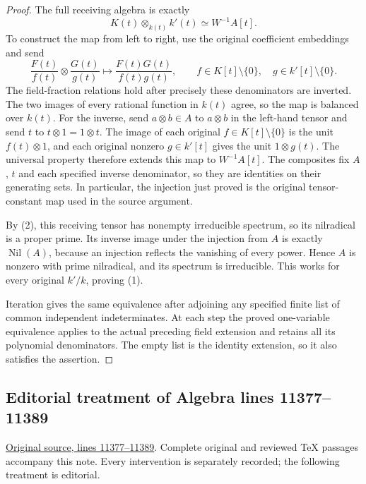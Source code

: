 \begin{proof}
The full receiving algebra is
exactly
$$
K(t)\otimes_{k(t)}k'(t)\simeq W^{-1}A[t].
$$
To construct the map from left
to right, use the original
coefficient embeddings and send
$$
\frac{F(t)}{f(t)}\otimes\frac{G(t)}{g(t)}
\longmapsto\frac{F(t)G(t)}{f(t)g(t)},
\qquad
f\in K[t]\setminus\{0\},\quad
g\in k'[t]\setminus\{0\}.
$$
The field-fraction relations hold
after precisely these denominators
are inverted. The two images of
every rational function in $k(t)$
agree, so the map is balanced over
$k(t)$. For the inverse, send
$a\otimes b\in A$ to $a\otimes b$
in the left-hand tensor and send
$t$ to $t\otimes1=1\otimes t$.
The image of each original
$f\in K[t]\setminus\{0\}$ is
the unit $f(t)\otimes1$, and
each original nonzero $g\in k'[t]$
gives the unit $1\otimes g(t)$.
The universal property therefore
extends this map to $W^{-1}A[t]$.
The composites fix $A$, $t$ and
each specified inverse denominator,
so they are identities on their
generating sets. In particular,
the injection just proved is
the original tensor-constant map
used in the source argument.

By (2), this receiving tensor
has nonempty irreducible spectrum,
so its nilradical is a proper
prime. Its inverse image under
the injection from $A$ is exactly
$\operatorname{Nil}(A)$, because
an injection reflects the vanishing
of every power. Hence $A$ is
nonzero with prime nilradical,
and its spectrum is irreducible.
This works for every original
$k'/k$, proving (1).

Iteration gives the same equivalence
after adjoining any specified finite
list of common independent
indeterminates. At each step the
proved one-variable equivalence
applies to the actual preceding
field extension and retains all
its polynomial denominators.
The empty list is the identity
extension, so it also satisfies
the assertion.
\end{proof}


\subsection{Editorial treatment of Algebra lines 11377--11389}

\hypertarget{algebra-context-145}{}

\noindent\href{https://github.com/stacks/stacks-project/blob/a04446e57ec1fbc252a871afcec7752fb2807b14/algebra.tex\#L11377}{Original source, lines 11377--11389}. Complete original and reviewed TeX passages accompany this note. Every intervention is separately recorded; the following treatment is editorial.


